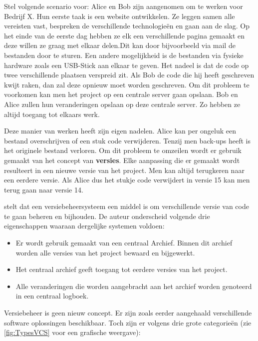 Stel volgende scenario voor: Alice en Bob zijn aangenomen om te werken voor Bedrijf X. Hun eerste taak is een website ontwikkelen. Ze leggen samen alle vereisten vast, bespreken de verschillende technologieën en gaan aan de slag. Op het einde van de eerste dag hebben ze elk een verschillende pagina gemaakt en deze willen ze graag met elkaar delen.Dit kan door bijvoorbeeld via mail de bestanden door te sturen. Een andere mogelijkheid is de bestanden via fysieke hardware zoals een USB-Stick aan elkaar te geven. Het nadeel is dat de code op twee verschillende plaatsen verspreid zit. Als Bob de code die hij heeft geschreven kwijt raken, dan zal deze opnieuw moet worden geschreven. Om dit probleem te voorkomen kan men het project op een centrale server gaan opslaan. Bob en Alice zullen hun veranderingen opslaan op deze centrale server. Zo hebben ze altijd toegang tot elkaars werk. 

Deze manier van werken heeft zijn eigen nadelen. Alice kan per ongeluk een bestand overschrijven of een stuk code verwijderen. Tenzij men back-ups heeft is het originele bestand verloren. Om dit probleem te omzeilen wordt er gebruik gemaakt van het concept van \textbf{versies}. Elke aanpassing die er gemaakt wordt resulteert in een nieuwe versie van het project. Men kan altijd terugkeren naar een eerdere versie. Als Alice dus het stukje code verwijdert in versie 15 kan men terug gaan naar versie 14.

\textcite{Loeliger2009} stelt dat een versiebeheersysteem een middel is om verschillende versie van code te gaan beheren en bijhouden. De auteur onderscheid volgende drie eigenschappen waaraan dergelijke systemen voldoen:

\begin{itemize}
	\item Er wordt gebruik gemaakt van een centraal Archief. Binnen dit archief worden alle versies van het project bewaard en bijgewerkt.
	\item Het centraal archief geeft toegang tot eerdere versies van het project.
	\item Alle veranderingen die worden aangebracht aan het archief worden genoteerd in een centraal logboek.
\end{itemize}

Versiebeheer is geen nieuw concept. Er zijn zoals eerder aangehaald verschillende software oplossingen beschikbaar. Toch zijn er volgens \textcite{Chacon2014} drie grote categorieën (zie \ref{fig:TypesVCS} voor een grafische weergave):

